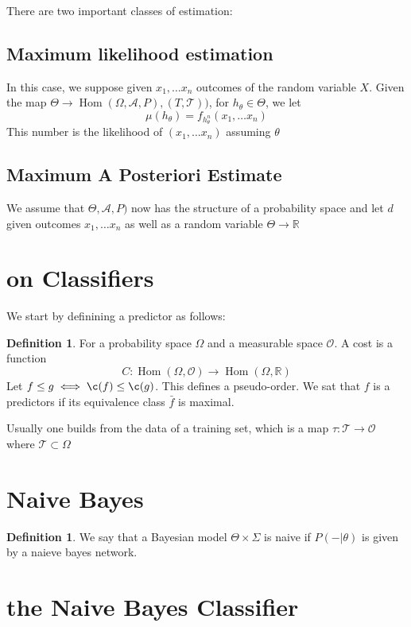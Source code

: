 \documentclass{book}
\theoremstyle{plain}
\theoremstyle{definition}
\newtheorem{definition}[corollary]{Definition}
\renewcommand{\d}[1]{\mathbb{#1}}
\DeclareMathOperator{\Hom}{Hom}
\newcommand{\mor}{\longrightarrow}
\renewcommand{\r}[1]{\mathcal{#1}}
\renewcommand{\r}[1]{\mathcal{#1}}
\begin{document}
There are two important classes of estimation:

\subsection{Maximum likelihood estimation}
 In this case, we suppose given $x_1,\dots x_n$ outcomes of the random variable $X$. Given the map $\Theta \mor \Hom(\Omega,\r{A},P), (T,\r{T}))$, for $h_\theta \in \Theta$, we let \[\mu(h_\theta)=f_{h_\theta^n}(x_1,\ldots x_n)\]
 This number is the likelihood of $(x_1,\ldots x_n)$ assuming $\theta$
 
 \subsection{Maximum A Posteriori Estimate}
 We assume that $\Theta,\r{A},P)$ now has the structure of a probability space and let $ d$ given outcomes $x_1,\ldots x_n$ as well as a random variable $\Theta\mor \d{R}$
\section{on Classifiers}

We start by definining a predictor as follows:
\begin{definition}
For a probability space $\Omega$ and a measurable space $\r{O}$. A cost is a function
\[
C:\Hom(\Omega,\r{O}) \mor \Hom(\Omega,\d{R})
\]	
Let $f\le g \iff \c(f)\le \c(g)$. This defines a pseudo-order. We sat that $f$ is a predictors if its equivalence class $\bar{f}$ is maximal.
\end{definition}

Usually one builds from the data of a training set, which is a map $\tau: \r{T}\mor \r{O}$ where $\r{T}\subset \Omega$

\section{Naive Bayes}

\begin{definition}
We say that a Bayesian model $\Theta \times \Sigma$ 	is naive if $P(-\vert \theta)$ is given by a naieve bayes network.
\end{definition}


\section{the Naive Bayes Classifier}
\end{document}
